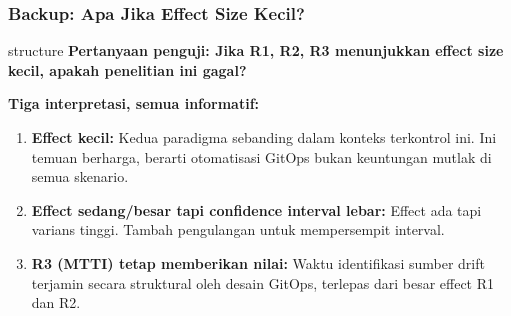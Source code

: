 {
\usebackgroundtemplate{\backgroundcontent}
\begin{frame}
    \frametitle{Backup: Apa Jika Effect Size Kecil?}
    \vspace{0.20cm}
    \begin{beamercolorbox}[wd=\textwidth, sep=0.20cm, center, rounded=true]{structure}
        \small\bfseries Pertanyaan penguji: Jika R1, R2, R3 menunjukkan effect size kecil, apakah penelitian ini gagal?
    \end{beamercolorbox}
    \vspace{0.12cm}
    \textbf{Tiga interpretasi, semua informatif:}
    \begin{enumerate}
        \item \textbf{Effect kecil:} Kedua paradigma sebanding dalam konteks terkontrol ini. Ini temuan berharga, berarti otomatisasi GitOps bukan keuntungan mutlak di semua skenario.
        \item \textbf{Effect sedang/besar tapi confidence interval lebar:} Effect ada tapi varians tinggi. Tambah pengulangan untuk mempersempit interval.
        \item \textbf{R3 (MTTI) tetap memberikan nilai:} Waktu identifikasi sumber drift terjamin secara struktural oleh desain GitOps, terlepas dari besar effect R1 dan R2.
    \end{enumerate}
    \vspace{0.08cm}
\end{frame}
}


